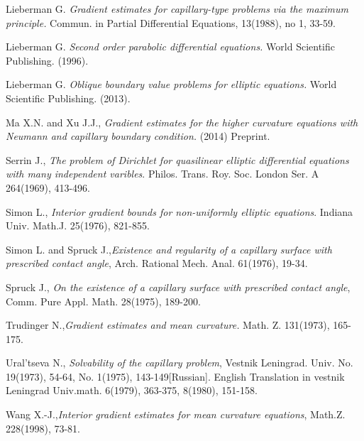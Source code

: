 \documentclass[11pt]{amsart}
\numberwithin{equation}{section}
\begin{document}
\begin{thebibliography}{14}
 Lieberman G. {\em Gradient estimates for capillary-type problems via the maximum principle.} Commun. in Partial Differential Equations, 13(1988), no 1, 33-59.

 Lieberman G. {\em Second order parabolic differential   equations.} World Scientific Publishing. (1996).

 Lieberman G. {\em Oblique boundary value problems for elliptic equations.} World Scientific Publishing. (2013).

 Ma X.N. and  Xu J.J., {\em Gradient estimates for the higher curvature  equations with Neumann and  capillary boundary condition.} (2014) Preprint.

Serrin J., {\em The problem of Dirichlet for quasilinear elliptic differential equations with many independent varibles}. Philos. Trans. Roy. Soc. London Ser. A  264(1969), 413-496.

Simon L., {\em Interior gradient bounds for non-uniformly elliptic equations}. Indiana Univ. Math.J. 25(1976), 821-855.

Simon L. and Spruck J.,{\em Existence and regularity of a capillary surface with prescribed contact angle}, Arch. Rational Mech. Anal. 61(1976), 19-34.

Spruck J., {\em On the existence of a capillary surface with prescribed contact angle}, Comm. Pure Appl. Math. 28(1975), 189-200.

 Trudinger N.,{\em Gradient estimates and mean curvature. } Math. Z. 131(1973), 165-175.


Ural'tseva N., {\em Solvability of the capillary problem}, Vestnik Leningrad. Univ. No. 19(1973), 54-64, No. 1(1975), 143-149[Russian]. English Translation in vestnik Leningrad Univ.math. 6(1979), 363-375, 8(1980), 151-158.

 Wang X.-J.,{\em Interior gradient estimates for mean curvature equations}, Math.Z. 228(1998), 73-81.
\end{thebibliography}
\end{document}
